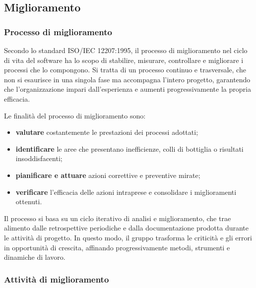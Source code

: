 \documentclass[a4paper, 10pt]{article}
\begin{document}
\subsection{Miglioramento}
\label{subsec:miglioramento}

\subsubsection{Processo di miglioramento}
\label{subsubsec:processo_miglioramento}

Secondo lo standard ISO/IEC 12207:1995, il processo di miglioramento nel ciclo di vita del software ha lo scopo di stabilire, misurare, controllare e migliorare i processi che lo compongono. Si tratta di un processo continuo e trasversale, che non si esaurisce in una singola fase ma accompagna l'intero progetto, garantendo che l'organizzazione impari dall'esperienza e aumenti progressivamente la propria efficacia.

Le finalità del processo di miglioramento sono:
\begin{itemize}
    \item \textbf{valutare} costantemente le prestazioni dei processi adottati;
    \item \textbf{identificare} le aree che presentano inefficienze, colli di bottiglia o risultati insoddisfacenti;
    \item \textbf{pianificare e attuare} azioni correttive e preventive mirate;
    \item \textbf{verificare} l'efficacia delle azioni intraprese e consolidare i miglioramenti ottenuti.
\end{itemize}

Il processo si basa su un ciclo iterativo di analisi e miglioramento, che trae alimento dalle retrospettive periodiche e dalla documentazione prodotta durante le attività di progetto. In questo modo, il gruppo trasforma le criticità e gli errori in opportunità di crescita, affinando progressivamente metodi, strumenti e dinamiche di lavoro.

\subsubsection{Attività di miglioramento}
\label{subsubsec:attivita_miglioramento}
\end{document}
